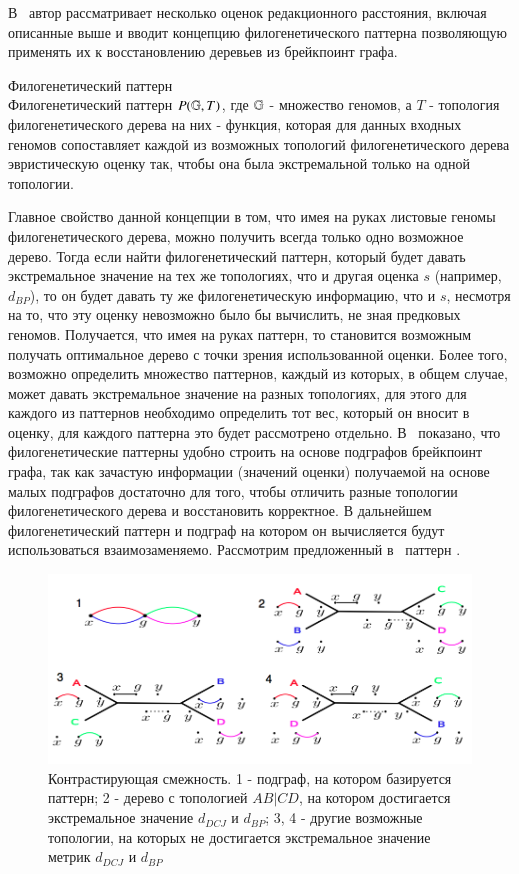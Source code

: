 В~\cite{xu2010exploring} автор рассматривает несколько оценок редакционного расстояния, включая описанные выше
и вводит концепцию филогенетического паттерна позволяющую применять их к восстановлению деревьев из брейкпоинт графа.
\begin{define}{Филогенетический паттерн} \\
  Филогенетический паттерн $P(\mathbb{G}, T)$, где $\mathbb{G}$ - множество геномов,
  а $T$ - топология филогенетического дерева на них - функция, которая для данных входных геномов
  сопоставляет каждой из возможных топологий филогенетического дерева эвристическую оценку так,
  чтобы она была экстремальной только на одной топологии.
\end{define}
Главное свойство данной концепции в том, что имея на руках листовые геномы филогенетического дерева, можно получить всегда только одно возможное дерево.
Тогда если найти филогенетический паттерн, который будет давать экстремальное значение на тех же топологиях,
что и другая оценка $s$ (например, $d_{BP}$), то он будет давать ту же филогенетическую информацию, что и $s$, несмотря на то,
что эту оценку невозможно было бы вычислить, не зная предковых геномов.
Получается, что имея на руках паттерн, то становится возможным получать оптимальное дерево с точки зрения использованной оценки.
Более того, возможно определить множество паттернов, каждый из которых, в общем случае, может давать экстремальное значение на разных топологиях,
для этого для каждого из паттернов необходимо определить тот вес, который он вносит в оценку, для каждого паттерна это будет рассмотрено отдельно.
В~\cite{xu2010exploring} показано, что филогенетические паттерны удобно строить на основе подграфов брейкпоинт графа,
так как зачастую информации (значений оценки) получаемой на основе малых подграфов достаточно для того,
чтобы отличить разные топологии филогенетического дерева и восстановить корректное.
В дальнейшем филогенетический паттерн и подграф на котором он вычисляется будут использоваться взаимозаменяемо.
Рассмотрим предложенный в~\cite{xu2010exploring} паттерн .
\begin{figure}[H]
  \centering
  \includegraphics[max width=\linewidth]{fig/2/contrasting_adjacency.png}
  \caption{Контрастирующая смежность.
    1 - подграф, на котором базируется паттерн;
    2 - дерево с топологией $AB|CD$, на котором достигается экстремальное значение $d_{DCJ}$ и $d_{BP}$;
    3, 4 - другие возможные топологии, на которых не достигается экстремальное значение метрик $d_{DCJ}$ и $d_{BP}$}
  \label{fig:contrasting_adjacency}
\end{figure}
